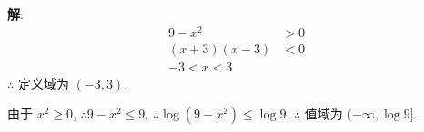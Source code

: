 \documentclass{report}
\newcommand{\sol}{\vspace{0.2cm}\textbf{解}:}
\begin{document}
\begin{multicols*}{2}
\begin{enumerate}[leftmargin=*]
              \sol{}
              \begin{align*}
                  9 - x^2        & > 0 \\
                  (x + 3)(x - 3) & < 0 \\
                  -3 < x < 3
              \end{align*}
              $\therefore$ 定义域为 $(-3, 3)$.

              由于 $x^2 \geq 0$, $\therefore 9 - x^2 \leq 9$, $\therefore \log (9 - x^2) \leq \log 9$, $\therefore$ 值域为 $(-\infty, \log 9]$.
    \end{enumerate}

\end{multicols*}
\end{document}
